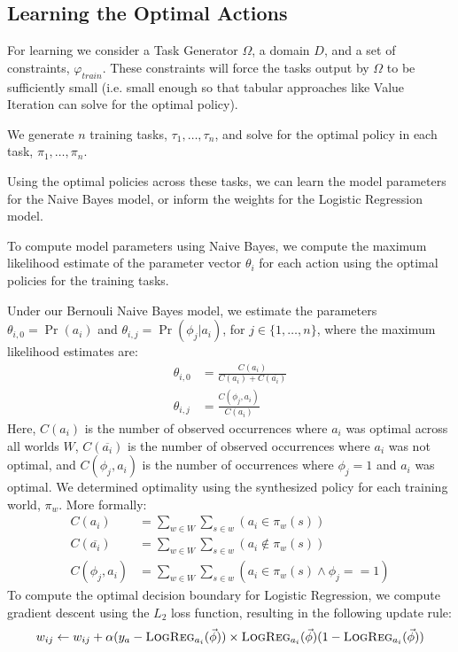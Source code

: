 \documentclass[11pt]{article}
\begin{document}
\subsection{Learning the Optimal Actions}
For learning we consider a Task Generator $\Omega$, a domain $D$, and a set of constraints, $\varphi_{train}$. These constraints will force the tasks output by $\Omega$ to be sufficiently small (i.e. small enough so that tabular approaches like Value Iteration can solve for the optimal policy).

We generate $n$ training tasks, $\tau_1, \ldots, \tau_n$, and solve for the optimal policy in each task, $\pi_1, \ldots, \pi_n$.

Using the optimal policies across these tasks, we can learn the model parameters for the Naive Bayes model, or inform the weights for the Logistic Regression model.

To compute model parameters using Naive Bayes, we compute
the maximum likelihood estimate of the parameter vector $\theta_i$ for
each action using the optimal policies for the training tasks.

Under our Bernouli Naive Bayes model, we estimate the parameters
$\theta_{i,0} = \Pr(a_i)$ and $\theta_{i,j} = \Pr(\phi_j | a_i)$, for $j \in \{1, \ldots, n \}$, where the maximum likelihood estimates are:
\begin{align}
\theta_{i,0} &= \frac{C(a_i)}{C(a_i) + C(\overline{a_i})} \\
\theta_{i,j} &= \frac{C(\phi_j, a_i)}{C(a_i)}
\end{align}
Here, $C(a_i)$ is the number of observed occurrences where $a_i$ was optimal across all worlds $W$,
$C(\overline{a_i})$ is the number of observed occurrences where $a_i$ was not optimal,
and $C(\phi_j, a_i)$ is the number of occurrences where $\phi_j=1$ and $a_i$ was optimal.
We determined optimality using the synthesized policy for each training world, $\pi_w$. More formally:
\begin{align}
C(a_i) &= \sum_{w \in W} \sum_{s \in w} (a_i \in \pi_w(s)) \\
C(\overline{a_i}) &= \sum_{w \in W} \sum_{s \in w} (a_i \not \in \pi_w(s) ) \\
C(\phi_j, a_i) &= \sum_{w \in W} \sum_{s \in w} (a_i  \in \pi_w(s) \wedge \phi_j == 1)
\end{align}
To compute the optimal decision boundary for Logistic Regression, we compute gradient descent using the $L_2$ loss function, resulting in the following update rule:
\begin{equation}
w_{ij} \leftarrow w_{ij} + \alpha(y_a - \textsc{LogReg}_{a_i}(\vec{\phi})) \times \textsc{LogReg}_{a_i}(\vec{\phi})(1 - \textsc{LogReg}_{a_i}(\vec{\phi}))
\end{equation}
\end{document}
